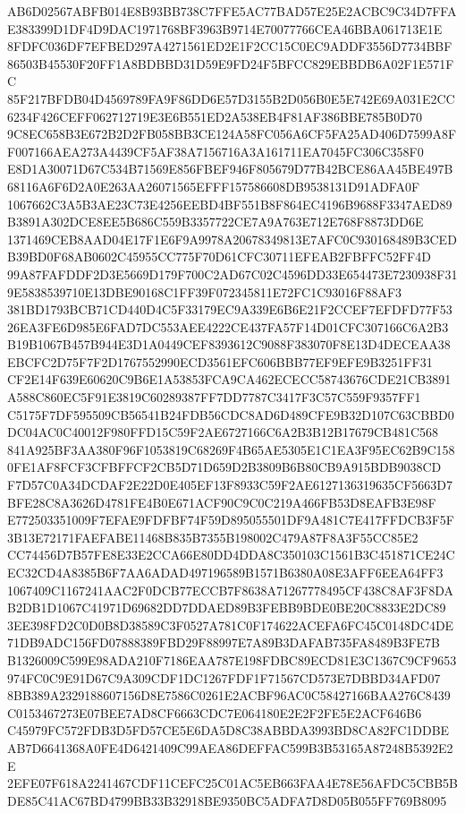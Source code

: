 \documentclass[UTF8,fontset=fandol,zihao=-4,a4paper]{ctexart}
\begin{document}
{{AB6D02567ABFB014E8B93BB738C7FFE5AC77BAD57E25E2ACBC9C34D7FFAE383399D1DF4D9DAC1971768BF3963B9714E70077766CEA46BBA061713E1E
8FDFC036DF7EFBED297A4271561ED2E1F2CC15C0EC9ADDF3556D7734BBF86503B45530F20FF1A8BDBBD31D59E9FD24F5BFCC829EBBDB6A02F1E571FC
85F217BFDB04D4569789FA9F86DD6E57D3155B2D056B0E5E742E69A031E2CC6234F426CEFF062712719E3E6B551ED2A538EB4F81AF386BBE785B0D70
9C8EC658B3E672B2D2FB058BB3CE124A58FC056A6CF5FA25AD406D7599A8FF007166AEA273A4439CF5AF38A7156716A3A161711EA7045FC306C358F0
E8D1A30071D67C534B71569E856FBEF946F805679D77B42BCE86AA45BE497B68116A6F6D2A0E263AA26071565EFFF157586608DB9538131D91ADFA0F
1067662C3A5B3AE23C73E4256EEBD4BF551B8F864EC4196B9688F3347AED89B3891A302DCE8EE5B686C559B3357722CE7A9A763E712E768F8873DD6E
1371469CEB8AAD04E17F1E6F9A9978A20678349813E7AFC0C930168489B3CEDB39BD0F68AB0602C45955CC775F70D61CFC30711EFEAB2FBFFC52FF4D
99A87FAFDDF2D3E5669D179F700C2AD67C02C4596DD33E654473E7230938F319E5838539710E13DBE90168C1FF39F072345811E72FC1C93016F88AF3
381BD1793BCB71CD440D4C5F33179EC9A339E6B6E21F2CCEF7EFDFD77F5326EA3FE6D985E6FAD7DC553AEE4222CE437FA57F14D01CFC307166C6A2B3
B19B1067B457B944E3D1A0449CEF8393612C9088F383070F8E13D4DECEAA38EBCFC2D75F7F2D1767552990ECD3561EFC606BBB77EF9EFE9B3251FF31
CF2E14F639E60620C9B6E1A53853FCA9CA462ECECC58743676CDE21CB3891A588C860EC5F91E3819C60289387FF7DD7787C3417F3C57C559F9357FF1
C5175F7DF595509CB56541B24FDB56CDC8AD6D489CFE9B32D107C63CBBD0DC04AC0C40012F980FFD15C59F2AE6727166C6A2B3B12B17679CB481C568
841A925BF3AA380F96F1053819C68269F4B65AE5305E1C1EA3F95EC62B9C1580FE1AF8FCF3CFBFFCF2CB5D71D659D2B3809B6B80CB9A915BDB9038CD
F7D57C0A34DCDAF2E22D0E405EF13F8933C59F2AE6127136319635CF5663D7BFE28C8A3626D4781FE4B0E671ACF90C9C0C219A466FB53D8EAFB3E98F
E772503351009F7EFAE9FDFBF74F59D895055501DF9A481C7E417FFDCB3F5F3B13E72171FAEFABE11468B835B7355B198002C479A87F8A3F55CC85E2
CC74456D7B57FE8E33E2CCA66E80DD4DDA8C350103C1561B3C451871CE24CEC32CD4A8385B6F7AA6ADAD497196589B1571B6380A08E3AFF6EEA64FF3
1067409C1167241AAC2F0DCB77ECCB7F8638A71267778495CF438C8AF3F8DAB2DB1D1067C41971D69682DD7DDAED89B3FEBB9BDE0BE20C8833E2DC89
3EE398FD2C0D0B8D38589C3F0527A781C0F174622ACEFA6FC45C0148DC4DE71DB9ADC156FD07888389FBD29F88997E7A89B3DAFAB735FA8489B3FE7B
B1326009C599E98ADA210F7186EAA787E198FDBC89ECD81E3C1367C9CF9653974FC0C9E91D67C9A309CDF1DC1267FDF1F71567CD573E7DBBD34AFD07
8BB389A2329188607156D8E7586C0261E2ACBF96AC0C58427166BAA276C8439C0153467273E07BEE7AD8CF6663CDC7E064180E2E2F2FE5E2ACF646B6
C45979FC572FDB3D5FD57CE5E6DA5D8C38ABBDA3993BD8CA82FC1DDBEAB7D6641368A0FE4D6421409C99AEA86DEFFAC599B3B53165A87248B5392E2E
2EFE07F618A2241467CDF11CEFC25C01AC5EB663FAA4E78E56AFDC5CBB5BDE85C41AC67BD4799BB33B32918BE9350BC5ADFA7D8D05B055FF769B8095
}}
\end{document}
